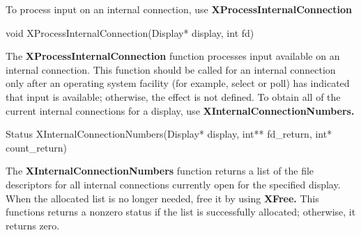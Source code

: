 \documentclass{report}
\begin{document}
\begin{itemize}
            \bigbreak \noindent 
            To process input on an internal connection, use \textbf{XProcessInternalConnection}
            \bigbreak \noindent 
            \begin{cppcode}
            void XProcessInternalConnection(Display* display, int fd)
            \end{cppcode}
            \bigbreak \noindent 
            The \textbf{XProcessInternalConnection} function processes input available on an internal connection. This function should be called for an internal connection only after an operating system facility (for example, select or poll) has indicated that input is available; otherwise, the effect is not defined.
            \bigbreak \noindent 
            To obtain all of the current internal connections for a display, use \textbf{XInternalConnectionNumbers.}
            \bigbreak \noindent 
            \begin{cppcode}
                Status XInternalConnectionNumbers(Display* display, int** fd_return, int* count_return)
            \end{cppcode}
            \bigbreak \noindent 
            The \textbf{XInternalConnectionNumbers} function returns a list of the file descriptors for all internal connections currently open for the specified display. When the allocated list is no longer needed, free it by using \textbf{XFree.} This functions returns a nonzero status if the list is successfully allocated; otherwise, it returns zero.
    \end{itemize}
\end{document}
